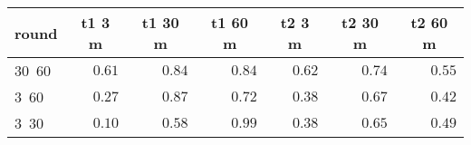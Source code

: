 %
\begin{table}[!tbp]
\begin{center}
\begin{tabular}{lrrrrrr}
\hline\hline
\multicolumn{1}{l}{round}&\multicolumn{1}{c}{t1 3 m}&\multicolumn{1}{c}{t1 30 m}&\multicolumn{1}{c}{t1 60 m}&\multicolumn{1}{c}{t2 3 m}&\multicolumn{1}{c}{t2 30 m}&\multicolumn{1}{c}{t2 60 m}\tabularnewline
\hline
30~60&$0.61$&$0.84$&$0.84$&$0.62$&$0.74$&$0.55$\tabularnewline
3~60&$0.27$&$0.87$&$0.72$&$0.38$&$0.67$&$0.42$\tabularnewline
3~30&$0.10$&$0.58$&$0.99$&$0.38$&$0.65$&$0.49$\tabularnewline
\hline
\end{tabular}
\end{center}
\end{table}

